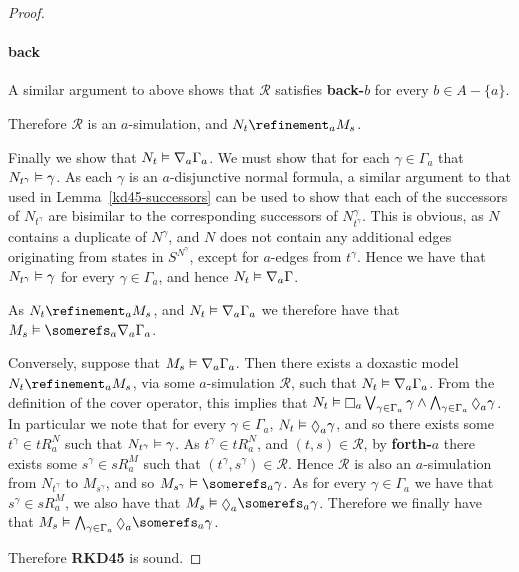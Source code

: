 \begin{proof}
\paragraph{back} A similar argument to above shows that $\mathcal{R}$ satisfies
{\bf back-$b$} for every $b \in A - \{a\}$.

Therefore $\mathcal{R}$ is an $a$-simulation, and $N_t \refinement_a M_s$. 

Finally we show that $N_t \vDash \nabla_a \Gamma_a$. We must show that for
each $\gamma \in \Gamma_a$ that $N_{t^\gamma} \vDash \gamma$. As each $\gamma$
is an $a$-disjunctive normal formula, a similar argument to that used in
Lemma~\ref{kd45-successors} can be used to show that each of the successors of
$N_{t^\gamma}$ are bisimilar to the corresponding successors of
$N^\gamma_{t^\gamma}$. This is obvious, as $N$ contains a duplicate of
$N^\gamma$, and $N$ does not contain any additional edges originating from
states in $S^{N^\gamma}$, except for $a$-edges from $t^\gamma$. Hence we have
that $N_{t^\gamma} \vDash \gamma$ for every $\gamma \in \Gamma_a$, and hence
$N_t \vDash \nabla_a \Gamma$.

As $N_t \refinement_a M_s$, and $N_t \vDash \nabla_a \Gamma_a$ we therefore
have that $M_s \entails \somerefs_a \covers_a \Gamma_a$.

Conversely, suppose that $M_s \vDash \nabla_a \Gamma_a$. Then there exists a
doxastic model $N_t \refinement_a M_s$, via some $a$-simulation $\mathcal{R}$,
such that $N_t \vDash \nabla_a \Gamma_a$. From the definition of the cover
operator, this implies that $N_t \entails \knows_a \bigvee_{\gamma \in \Gamma_a}
\gamma \land \bigwedge_{\gamma \in \Gamma_a} \suspects_a \gamma$. In particular we
note that for every $\gamma \in \Gamma_a$, $N_t \entails \suspects_a \gamma$, and
so there exists some $t^\gamma \in tR^N_a$ such that $N_{t^\gamma} \vDash
\gamma$. As $t^\gamma \in tR^N_a$, and $(t, s) \in \mathcal{R}$, by {\bf
forth-$a$} there exists some $s^\gamma \in sR^M_a$ such that $(t^\gamma, s^\gamma)
\in \mathcal{R}$. Hence $\mathcal{R}$ is also an $a$-simulation from
$N_{t^\gamma}$ to $M_{s^\gamma}$, and so $M_{s^\gamma} \entails \somerefs_a
\gamma$. As for every $\gamma \in \Gamma_a$ we have that $s^\gamma \in sR^M_a$, we
also have that $M_s \entails \suspects_a \somerefs_a \gamma$. Therefore we
finally have that $M_s \entails \bigwedge_{\gamma \in \Gamma_a} \suspects_a
\somerefs_a \gamma$.

Therefore {\bf RKD45} is sound.


\end{proof}
